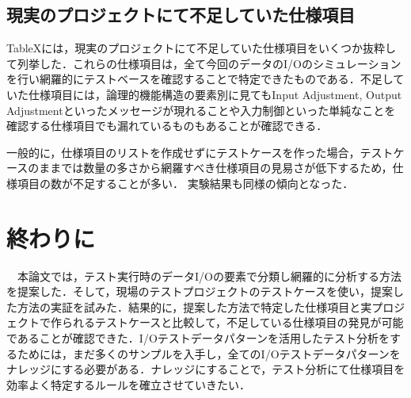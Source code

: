 \subsection{現実のプロジェクトにて不足していた仕様項目}
TableXには，現実のプロジェクトにて不足していた仕様項目をいくつか抜粋して列挙した．これらの仕様項目は，全て今回のデータのI/Oのシミュレーションを行い網羅的にテストベースを確認することで特定できたものである．不足していた仕様項目には，論理的機能構造の要素別に見てもInput Adjustment, Output Adjustmentといったメッセージが現れることや入力制御といった単純なことを確認する仕様項目でも漏れているものもあることが確認できる．

一般的に，仕様項目のリストを作成せずにテストケースを作った場合，テストケースのままでは数量の多さから網羅すべき仕様項目の見易さが低下するため，仕様項目の数が不足することが多い．
実験結果も同様の傾向となった．

\newpage
\section{終わりに}
　本論文では，テスト実行時のデータI/Oの要素で分類し網羅的に分析する方法を提案した．そして，現場のテストプロジェクトのテストケースを使い，提案した方法の実証を試みた．結果的に，提案した方法で特定した仕様項目と実プロジェクトで作られるテストケースと比較して，不足している仕様項目の発見が可能であることが確認できた．I/Oテストデータパターンを活用したテスト分析をするためには，まだ多くのサンプルを入手し，全てのI/Oテストデータパターンをナレッジにする必要がある．ナレッジにすることで，テスト分析にて仕様項目を効率よく特定するルールを確立させていきたい．
